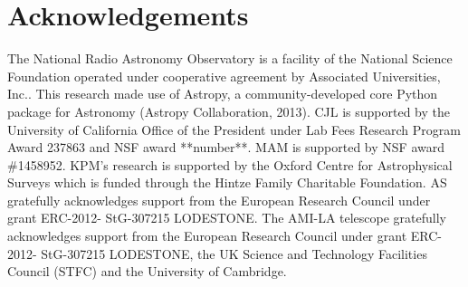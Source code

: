 \documentclass[twocolumn]{aastex61}
\begin{document}
\section*{Acknowledgements}
The National Radio Astronomy Observatory is a facility of the National Science Foundation operated under cooperative agreement by Associated Universities, Inc..
This research made use of Astropy, a community-developed core Python package for Astronomy (Astropy Collaboration, 2013).
CJL is supported by the University of California Office of the President under Lab Fees Research Program Award 237863 and NSF award **number**.
MAM is supported by NSF award \#1458952. 
KPM's research is supported by the Oxford Centre for Astrophysical Surveys which is funded through the Hintze Family Charitable Foundation. AS gratefully acknowledges support from the European Research Council under grant ERC-2012- StG-307215 LODESTONE. The AMI-LA telescope gratefully acknowledges support from the European Research Council under grant ERC-2012- StG-307215 LODESTONE, the UK Science and Technology Facilities Council (STFC) and the University of Cambridge.





\end{document}
